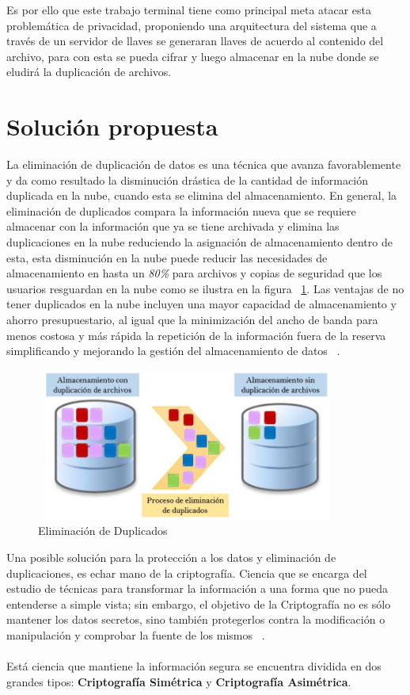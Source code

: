 Es por ello que este trabajo terminal tiene como principal meta atacar esta problemática de privacidad, proponiendo una arquitectura del sistema que a través de un servidor de llaves se generaran llaves de acuerdo al contenido del archivo, para con esta se pueda cifrar y luego almacenar en la nube donde se eludirá la duplicación de archivos. 



\section{Solución propuesta}
La eliminación de duplicación de datos es una técnica que avanza favorablemente y da como resultado la disminución drástica de la cantidad de información duplicada en la nube, cuando esta se elimina del almacenamiento. En general, la eliminación de duplicados compara la información nueva que se requiere almacenar con la información que ya se tiene archivada y elimina las duplicaciones en la nube reduciendo la asignación de almacenamiento dentro de esta, esta disminución en la nube puede reducir las necesidades de almacenamiento en hasta un \textit{80\%} para archivos y copias de seguridad que los usuarios resguardan en la nube como se ilustra en la figura ~\ref{fig:1-3-1}. Las ventajas de no tener duplicados en la nube incluyen una mayor capacidad de almacenamiento y ahorro presupuestario, al igual que la minimización del ancho de banda para menos costosa y más rápida la repetición de la información fuera de la reserva simplificando y mejorando la gestión del almacenamiento de datos  ~\cite{rededup}. 

\begin{figure}[H]
\centering
	\includegraphics[width=10cm, height=5cm]{./images/Deduplicacion.jpg}
	\caption{Eliminación de Duplicados}
	\label{fig:1-3-1}
\end{figure}

Una posible solución para la protección a los datos y eliminación de duplicaciones, es echar mano de la criptografía. Ciencia que se encarga del estudio de técnicas para transformar la información a una forma que no pueda entenderse a simple vista; sin embargo, el objetivo de la Criptografía no es sólo mantener los datos secretos, sino también protegerlos contra la modificación o manipulación y comprobar la fuente de los mismos ~\cite{fundamentos}. \\   \\
Está ciencia que mantiene la información segura se encuentra dividida en dos grandes tipos: \textbf{Criptografía Simétrica} y \textbf{Criptografía Asimétrica}.  \\

